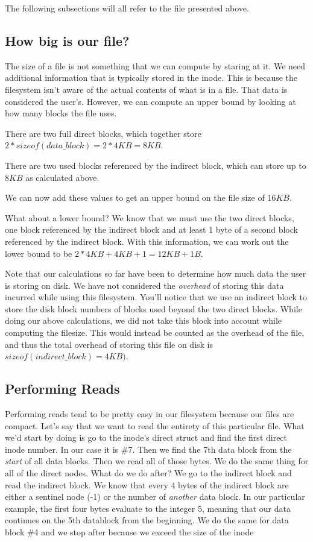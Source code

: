 The following subsections will all refer to the file presented above.

\subsection{How big is our file?}
The size of a file is not something that we can compute by staring at it. We need additional information that is
typically stored in the inode. This is because the filesystem isn't aware of the actual contents of what is in a file.
That data is considered the user's. However, we can compute an upper bound by looking at how many blocks the file uses.

There are two full direct blocks, which together store $2*sizeof(data\_block)=2*4KB=8KB$.

There are two used blocks referenced by the indirect block, which can store up to $8KB$ as calculated above.

We can now add these values to get an upper bound on the file size of $16KB$.

What about a lower bound? We know that we must use the two direct blocks, one block referenced by the indirect block and at least 1 byte of a
second block referenced by the indirect block. With this information, we can work out the lower bound to be $2*4KB+4KB+1=12KB+1B$.

Note that our calculations so far have been to determine how much data the user is storing on disk. We have not
considered the \textit{overhead} of storing this data incurred while using this filesystem. You'll notice that we use an
indirect block to store the disk block numbers of blocks used beyond the two direct blocks. While doing our above
calculations, we did not take this block into account while computing the filesize. This would instead be counted as the
overhead of the file, and thus the total overhead of storing this file on disk is $sizeof(indirect\_block)=4KB)$.

\subsection{Performing Reads}

Performing reads tend to be pretty easy in our filesystem because our files are compact. Let's say that we want to read
the entirety of this particular file. What we'd start by doing is go to the inode's direct struct and find the first
direct inode number. In our case it is \#7. Then we find the 7th data block from the \textit{start} of all data blocks.
Then we read all of those bytes.
We do the same thing for all of the direct nodes. What do we do after? We go to the indirect block and read the
indirect block. We know that every 4 bytes of the indirect block are either a sentinel node (-1) or the number of
\textit{another} data block. In our particular example, the first four bytes evaluate to the integer 5, meaning that
our data continues on the 5th datablock from the beginning. We do the same for data block \#4 and we stop after because
we exceed the size of the inode

